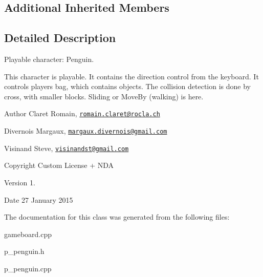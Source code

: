 \subsection*{Additional Inherited Members}


\subsection{Detailed Description}
Playable character\+: Penguin. 

This character is playable. It contains the direction control from the keyboard. It controls player\textquotesingle{}s bag, which contains objects. The collision detection is done by cross, with smaller blocks. Sliding or Move\+By (walking) is here. \begin{DoxyAuthor}{Author}
Claret Romain, \href{mailto:romain.claret@rocla.ch}{\tt romain.\+claret@rocla.\+ch} 

Divernois Margaux, \href{mailto:margaux.divernois@gmail.com}{\tt margaux.\+divernois@gmail.\+com} 

Visinand Steve, \href{mailto:visinandst@gmail.com}{\tt visinandst@gmail.\+com} 
\end{DoxyAuthor}
\begin{DoxyCopyright}{Copyright}
Custom License + N\+D\+A 
\end{DoxyCopyright}
\begin{DoxyVersion}{Version}
1. 
\end{DoxyVersion}
\begin{DoxyDate}{Date}
27 January 2015 
\end{DoxyDate}


The documentation for this class was generated from the following files\+:\begin{DoxyCompactItemize}
\item 
gameboard.\+cpp\item 
p\+\_\+penguin.\+h\item 
p\+\_\+penguin.\+cpp\end{DoxyCompactItemize}
